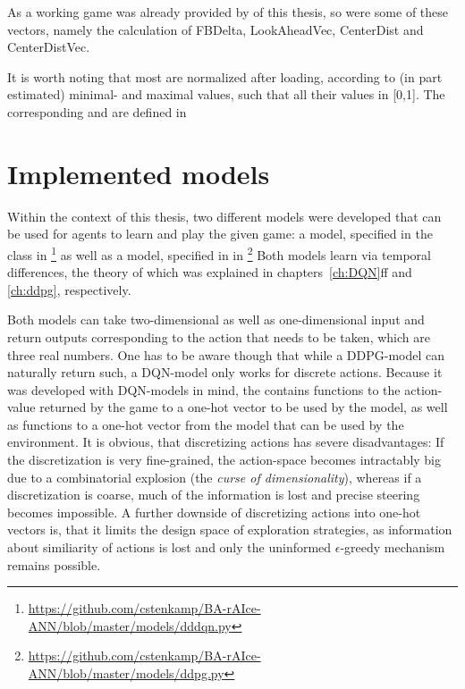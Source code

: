 As a working game was already provided by \leon of this thesis, so were some of these vectors, namely the calculation of FBDelta, LookAheadVec, CenterDist and CenterDistVec.

It is worth noting that most  are normalized after loading, according to (in part estimated) minimal- and maximal values, such that all their values in [0,1]. The corresponding  and  are defined in 

\section{Implemented models}

Within the context of this thesis, two different models were developed that can be used for agents to learn and play the given game: a  model, specified in the class  in \footnote{\url{https://github.com/cstenkamp/BA-rAIce-ANN/blob/master/models/dddqn.py}} as well as a  model, specified in  in \footnote{\url{https://github.com/cstenkamp/BA-rAIce-ANN/blob/master/models/ddpg.py}} Both models learn via temporal differences, the theory of which was explained in chapters~\ref{ch:DQN}ff and \ref{ch:ddpg}, respectively. 

Both models can take two-dimensional as well as one-dimensional input and return outputs corresponding to the action that needs to be taken, which are three real numbers. One has to be aware though that while a DDPG-model can naturally return such, a DQN-model only works for discrete actions. Because it was developed with DQN-models in mind, the  contains functions to  the action-value returned by the game to a one-hot vector to be used by the model, as well as functions to  a one-hot vector from the model that can be used by the environment. It is obvious, that discretizing actions has severe disadvantages: If the discretization is very fine-grained, the action-space becomes intractably big due to a combinatorial explosion (the \textit{curse of dimensionality}), whereas if a discretization is coarse, much of the information is lost and precise steering becomes impossible. A further downside of discretizing actions into one-hot vectors is, that it limits the design space of exploration strategies, as information about similiarity of actions is lost and only the uninformed $\epsilon$-greedy mechanism remains possible.



